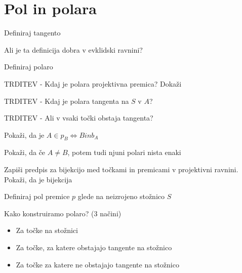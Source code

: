 \documentclass{article}
\begin{document}
    \section{Pol in polara}
    \begin{enumerate}
        \item Definiraj tangento
        \item Ali je ta definicija dobra v evklidski ravnini?
        \item Definiraj polaro
        {\color{red}\item TRDITEV - Kdaj je polara projektivna premica? Dokaži}
        \item TRDITEV - Kdaj je polara tangenta na $S$ v $A$?
        {\color{red}\item TRDITEV - Ali v vsaki točki obstaja tangenta?}
        \item Pokaži, da je $A \in p_B \Leftrightarrow B in b_A$
        {\color{red}\item Pokaži, da če $A \neq B$, potem tudi njuni polari nista enaki}
        {\color{red}\item Zapiši predpis za bijekcijo med točkami in premicami v projektivni ravnini. Pokaži, da je bijekcija}
        \item Definiraj pol premice $p$ glede na neizrojeno stožnico $S$
        \item Kako konstruiramo polaro? (3 načini)
        \begin{itemize}
            \item Za točke na stožnici
            \item Za točke, za katere obstajajo tangente na stožnico
            \item Za točke za katere ne obstajajo tangente na stožnico 
        \end{itemize}
    \end{enumerate}
\end{document}
